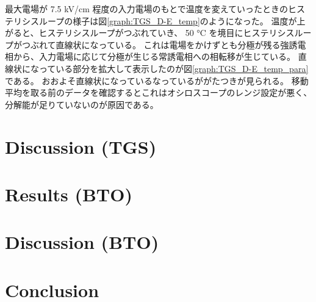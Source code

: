 \documentclass[11pt,dvipdfmx,a4paper]{jsarticle}
\begin{document}
最大電場が 7.5 kV/cm 程度の入力電場のもとで温度を変えていったときのヒステリシスループの様子は図\ref{graph:TGS_D-E_temp}のようになった。
温度が上がると、ヒステリシスループがつぶれていき、
50 \si{\degreeCelsius} を境目にヒステリシスループがつぶれて直線状になっている。
これは電場をかけずとも分極が残る強誘電相から、入力電場に応じて分極が生じる常誘電相への相転移が生じている。
直線状になっている部分を拡大して表示したのが図\ref{graph:TGS_D-E_temp_para}である。
おおよそ直線状になっているなっているががたつきが見られる。
移動平均を取る前のデータを確認するとこれはオシロスコープのレンジ設定が悪く、分解能が足りていないのが原因である。

\section{Discussion (TGS)}

\section{Results (BTO)}

\section{Discussion (BTO)}

\section{Conclusion}




\nocite{*}

\end{document}
